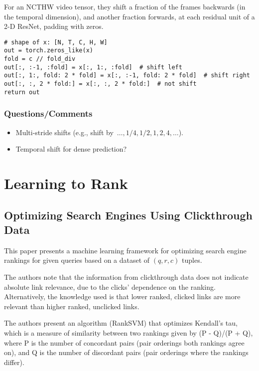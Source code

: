 \documentclass[a4paper, 12pt]{article}
\begin{document}
For an NCTHW video tensor, they shift a fraction of the frames backwards (in
the temporal dimension), and another fraction forwards, at each residual unit
of a 2-D ResNet, padding with zeros.

\begin{verbatim}
# shape of x: [N, T, C, H, W]
out = torch.zeros_like(x)
fold = c // fold_div
out[:, :-1, :fold] = x[:, 1:, :fold]  # shift left
out[:, 1:, fold: 2 * fold] = x[:, :-1, fold: 2 * fold]  # shift right
out[:, :, 2 * fold:] = x[:, :, 2 * fold:]  # not shift
return out
\end{verbatim}


\subsubsection{Questions/Comments}

\begin{itemize}
        \item Multi-stride shifts (e.g., shift
                by~$\dots, 1/4, 1/2, 1, 2, 4, \dots$).

        \item Temporal shift for dense prediction?
\end{itemize}


\section{Learning to Rank}


\subsection{Optimizing Search Engines Using Clickthrough
            Data~\cite{joachims-optimizing-2002}}

This paper presents a machine learning framework for optimizing search engine
rankings for given queries based on a dataset of $(q, r, c)$ tuples.

The authors note that the information from clickthrough data does not indicate
absolute link relevance, due to the clicks' dependence on the ranking.
Alternatively, the knowledge used is that lower ranked, clicked links are more
relevant than higher ranked, unclicked links.

The authors present an algorithm (RankSVM) that optimizes Kendall's tau, which
is a measure of similarity between two rankings given by (P - Q)/(P + Q), where
P is the number of concordant pairs (pair orderings both rankings agree on),
and Q is the number of discordant pairs (pair orderings where the rankings
differ).
\end{document}
